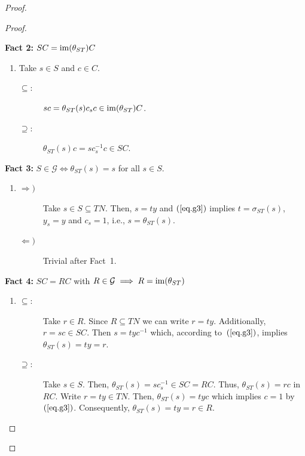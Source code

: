 \begin{proof}
\begin{proof}
\begin{enumerate}[a),font=\upshape]
    \textbf{Fact 2:} $SC=\operatorname{im}(\theta_{ST})C$
    
    {\small
    \begin{enumerate}
        \item[$\to$]
        Take $s\in S$ and $c\in C$.
        \begin{description}
            \item[$\subseteq\colon$] $sc = \theta_{ST}(s)c_sc \in\operatorname{im}(\theta_{ST})C$.
            \item[$\supseteq\colon$] $\theta_{ST}(s)c = sc_s^{-1}c \in SC$.
        \end{description}
    \end{enumerate}
    }
    
    \textbf{Fact 3:} $S\in\mathcal G\iff \theta_{ST}(s)=s$ for all $s\in S$.

    {\small
    \begin{enumerate}
        \item[$\to$]
        \begin{description}
            \item[$\Rightarrow)$] Take $s\in S\subseteq TN$. Then, $s=ty$ and $(\ref{eq.g3})$ implies $t=\sigma_{ST}(s)$, $y_s=y$ and $c_s=1$, i.e., $s=\theta_{ST}(s)$.
            
            \item[$\Leftarrow)$] Trivial after Fact~1.
    
        \end{description}
    \end{enumerate}
    }

    \textbf{Fact 4:} $SC=RC$ with $R\in\mathcal G\implies R=\operatorname{im}(\theta_{ST})$
    
    {\small
    \begin{enumerate}
        \item[$\to$]
        \begin{description}
        \item[$\subseteq\colon$] Take $r\in R$. Since $R\subseteq TN$ we can write $r=ty$. Additionally, $r=sc\in SC$. Then $s=tyc^{-1}$ which, according to~$(\ref{eq.g3})$, implies $\theta_{ST}(s)=ty=r$.
        
        \item[$\supseteq\colon$] Take $s\in S$. Then, $\theta_{ST}(s)=sc_s^{-1}\in SC=RC$. Thus, $\theta_{ST}(s)=rc$ in~$RC$. Write $r=ty\in TN$. Then, $\theta_{ST}(s)=tyc$ which implies $c=1$ by~$(\ref{eq.g3})$. Consequently, $\theta_{ST}(s)=ty=r\in R$.
        \end{description}
    \end{enumerate}
    }


\end{enumerate}
\end{proof}
\end{proof}
